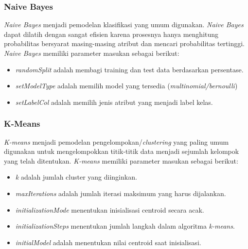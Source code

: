 \subsubsection{Naive Bayes}
\label{sec:naivebayes_mllib}
\textit{Naive Bayes} menjadi pemodelan klasifikasi yang umum digunakan. \textit{Naive Bayes} dapat dilatih dengan sangat efisien karena prosesnya hanya menghitung probabilitas bersyarat masing-masing atribut dan mencari probabilitas tertinggi. \textit{Naive Bayes} memiliki parameter masukan sebagai berikut:
 
\begin{itemize}
\item \textit{randomSplit} adalah membagi training dan test data berdasarkan persentase.
\item \textit{setModelType} adalah memilih model yang tersedia (\textit{multinomial/bernoulli})
\item \textit{setLabelCol} adalah memilih jenis atribut yang menjadi label kelas.
\end{itemize}

\subsubsection{K-Means}
\label{sec:kmeans_mllib}
\textit{K-means} menjadi pemodelan pengelompokan/\textit{clustering} yang paling umum digunakan untuk mengelompokkan titik-titik data menjadi sejumlah kelompok yang telah ditentukan. \textit{K-means} memiliki parameter masukan sebagai berikut:

\begin{itemize}
\item \textit{k} adalah jumlah cluster yang diinginkan. 
\item \textit{maxIterations} adalah jumlah iterasi maksimum yang harus dijalankan.
\item \textit{initializationMode} menentukan inisialisasi centroid secara acak.
\item \textit{initializationSteps} menentukan jumlah langkah dalam algoritma \textit{k-means}.
\item \textit{initialModel} adalah menentukan nilai centroid saat inisialisasi.
\end{itemize}

